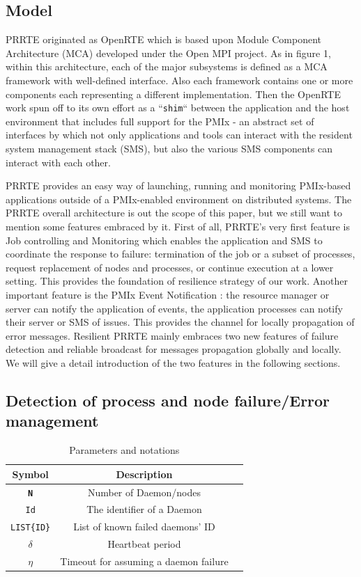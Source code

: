 \documentclass[sigconf]{acmart}
\begin{document}
\subsection{Model}
PRRTE originated as OpenRTE \cite{Castain05} which is based upon Module Component Architecture (MCA) developed under the Open MPI project. As in figure 1, within this architecture, each of the major subsystems is defined as a MCA framework with well-defined interface. Also each framework contains one or more components each representing a different implementation. Then the OpenRTE work spun off to its own effort as a ``\verb|shim|`` between the application and the host environment that includes full support for the PMIx \cite{CASTAIN18} - an abstract set of interfaces by which not only applications and tools can interact with the resident system management stack (SMS), but also the various SMS components can interact with each other. 

PRRTE provides an easy way of launching, running and monitoring PMIx-based applications outside of a PMIx-enabled environment on distributed systems. The PRRTE overall architecture is out the scope of this paper, but we still want to mention some features embraced by it. First of all, PRRTE's very first feature is Job controlling and Monitoring \cite{Ralph15} which enables the application and SMS to coordinate the response to failure: termination of the job or a subset of processes, request replacement of nodes and processes, or continue execution at a lower setting. This provides the foundation of resilience strategy of our work. Another important feature is the PMIx Event Notification \cite{Ralph002} : the resource manager or server can notify the application of events, the application processes can notify their server or SMS of issues. This provides the channel for locally propagation of error messages. Resilient PRRTE mainly embraces two new features of failure detection and reliable broadcast for messages propagation globally and locally. We will give a detail introduction of the two features in the following sections.

\subsection{Detection of process and node failure/Error management}

\begin{table}
  \caption{Parameters and notations}
  \label{tab:parameters}
  \begin{tabular}{ccl}
    \toprule
    Symbol & Description \\
    \midrule
    \texttt{\bf N} & Number of Daemon/nodes \\
    \texttt{Id} & The identifier of a Daemon \\
    \texttt{LIST\{ID\}} & List of known failed daemons' ID \\
    $\delta$ & Heartbeat period \\
    $\eta$ & Timeout for assuming a daemon failure\\
    \bottomrule
  \end{tabular}
\end{table}
\end{document}

